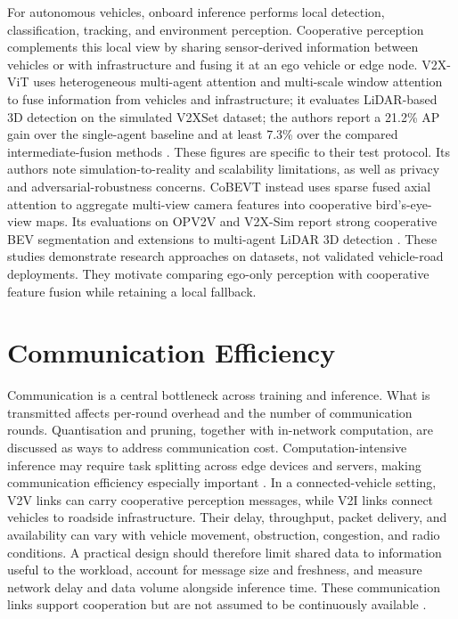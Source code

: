 \documentclass[12pt,a4paper,oneside]{report}
\begin{document}
For autonomous vehicles, onboard inference performs local detection,
classification, tracking, and environment perception. Cooperative
perception complements this local view by sharing sensor-derived
information between vehicles or with infrastructure and fusing it at an
ego vehicle or edge node. V2X-ViT uses heterogeneous multi-agent attention
and multi-scale window attention to fuse information from vehicles and
infrastructure; it evaluates LiDAR-based 3D detection on the simulated
V2XSet dataset; the authors report a 21.2\% AP gain over the single-agent
baseline and at least 7.3\% over the compared intermediate-fusion methods
\cite{v2xvit2022}. These figures are specific to their test protocol. Its
authors note simulation-to-reality and scalability limitations, as well as
privacy and adversarial-robustness concerns. CoBEVT instead uses sparse
fused axial attention to aggregate
multi-view camera features into cooperative bird's-eye-view maps. Its
evaluations on OPV2V and V2X-Sim report strong cooperative BEV segmentation
and extensions to multi-agent LiDAR 3D detection \cite{cobevt2023}. These
studies demonstrate research approaches on datasets, not validated
vehicle-road deployments. They motivate comparing ego-only perception
with cooperative feature fusion while retaining a local fallback.

\section{Communication Efficiency}

Communication is a central bottleneck across training and inference. What is
transmitted affects per-round overhead and the number of communication
rounds. Quantisation and pruning, together with in-network computation, are
discussed as ways to address communication cost. Computation-intensive
inference may require task splitting across edge devices and servers, making
communication efficiency especially important \cite{deng2020,hou2022}. In a
connected-vehicle setting, V2V links can carry cooperative perception
messages, while V2I links connect vehicles to roadside infrastructure.
Their delay, throughput, packet delivery, and availability can vary with
vehicle movement, obstruction, congestion, and radio conditions. A practical
design should therefore limit shared data to information useful to the
workload, account for message size and freshness, and measure network delay
and data volume alongside inference time. These communication links support
cooperation but are not assumed to be continuously available
\cite{biswas2023}.
\end{document}
